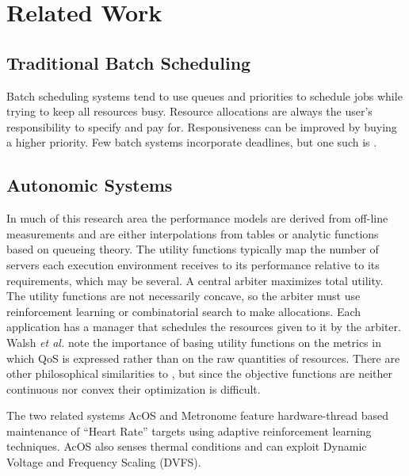 \section{Related Work}\label{related_work}
\subsection{Traditional Batch Scheduling}
Batch scheduling systems\cite{Feit97,FRS04} tend to use queues and priorities to schedule jobs while trying to keep all resources busy.
Resource allocations are always the user's responsibility to specify and pay for.
Responsiveness can be improved by buying a higher priority.
Few batch systems incorporate deadlines, but one such is \cite{AKKMS95}.



\subsection{Autonomic Systems}
%	
%
%	
%
In much of this research area\cite{1078472,1078493,1285843,1345325}
the performance models are derived from off-line measurements and are either
interpolations from tables or analytic functions based on queueing theory.
The utility functions typically map the number of servers each execution environment receives
to its performance relative to its requirements, which may be several.
A central arbiter maximizes total utility. The utility functions are not necessarily concave,
so the arbiter must use reinforcement learning or combinatorial search to make allocations.
Each application has a manager that schedules the resources given to it by the arbiter.
%
Walsh \emph{et al.}\cite{1078411} note the importance of basing utility functions
on the metrics in which QoS is expressed rather than on the raw quantities of resources.
There are other philosophical similarities to \pacora,
but since the objective functions are neither continuous nor convex their optimization is difficult.

%
%
The two related systems AcOS\cite{AcOS} and Metronome\cite{Metronome} feature hardware-thread based maintenance of ``Heart Rate''
targets using adaptive reinforcement learning techniques.
AcOS also senses thermal conditions and can exploit Dynamic Voltage and Frequency Scaling (DVFS).

